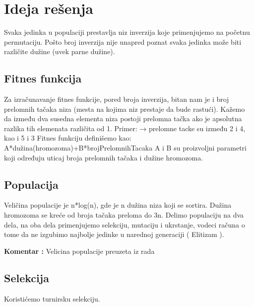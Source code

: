 \documentclass{article}
\begin{document}
\newpage
\section{Ideja rešenja}
Svaka jedinka u populaciji prestavlja niz inverzija koje primenjujemo na početnu permutaciju. Pošto broj inverzija nije unapred poznat svaka jedinka može biti različite dužine (uvek parne dužine).

\subsection{Fitnes funkcija}

Za izračunavanje fitnes funkcije, pored broja inverzija, bitan nam je i broj prelomnih tačaka niza (mesta na kojima niz prestaje da bude rastući).
\newline
\newline
Kažemo da između dva susedna elementa niza postoji prelomna tačka ako je apsolutna razlika tih elemenata različita od 1.
\newline
\newline
Primer:
\newline
[1,2,4,5,3] → prelomne tacke su između 2 i 4, kao i 5 i 3
\newline
\newline
Fitnes funkciju definišemo kao:
\newline
\newline
A*dužina(hromozoma)+B*brojPrelomnihTacaka
\newline
\newline
A i B su proizvoljni parametri koji određuju uticaj broja prelomnih tačaka i dužine hromozoma.
\newpage
\subsection{Populacija}
Veličina populacije je n*log(n), gde je n dužina niza koji se sortira.
Dužina hromozoma se kreće od broja tačaka preloma do 3n. Delimo populaciju na dva dela, na oba dela primenjujemo selekciju, mutaciju i ukrstanje, vodeci računa o tome da ne izgubimo najbolje jedinke u narednoj generaciji ( Elitizam ).

\textbf{Komentar :}  Velicina populacije preuzeta iz rada \cite{prva}

\subsection{Selekcija}
Koristićemo turnirsku selekciju.
\end{document}
